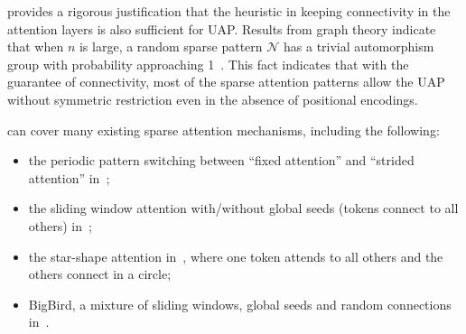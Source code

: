 \documentclass{article}
\newtheorem{proposition}{Proposition}
\newcommand{\cjp}[1]{{\footnotesize\textcolor{orange}{JC: #1}}}
\newcommand{\lt}[1]{{\footnotesize\textcolor{cyan!60!black}{\tt TL: #1}}}
\newcommand{\ql}[1]{{\footnotesize\textcolor{red}{QL: #1}}}
\begin{document}

 provides a rigorous justification that the heuristic in keeping connectivity in the attention layers is also sufficient for UAP.
Results from graph theory indicate that when $n$ is large, a random sparse pattern $\mathcal N$ has a trivial automorphism group with probability approaching 1~\cite{erdos1963asymmetric}. This fact indicates that with the guarantee of connectivity, most of the sparse attention patterns
allow the UAP without symmetric restriction even in the absence of positional encodings.


 can cover many existing sparse attention mechanisms, including the following:
\begin{itemize}
    \item the periodic pattern switching between ``fixed attention'' and ``strided attention'' in~\cite{child2019generating};
    \item the sliding window attention with/without global seeds (tokens connect to all others) in~\cite{beltagy2020longformer};
    \item the star-shape attention in~\cite{guo2019star}, where one token attends to all others and the others connect in a circle;
    \item BigBird, a mixture of sliding windows, global seeds and random connections in~\cite{zaheer2020big}.
\end{itemize}
\end{document}
